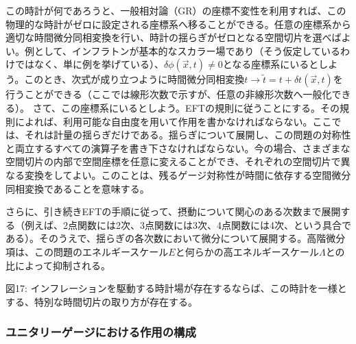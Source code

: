 この時計が何であろうと、一般相対論（GR）の座標不変性を利用すれば、この物理的な時計がゼロに設定される座標系へ移ることができる。任意の座標系から適切な時間微分同相変換を行い、時計の揺らぎがゼロとなる空間切片を選べばよい。例として、インフラトンが基本的なスカラー場であり（そう仮定しているわけではなく、単に例を挙げている）、$\delta\phi(\vec{x},t)\ne0$となる座標系にいるとしよう。このとき、次式が成り立つように時間微分同相変換$t\to\tilde{t}=t+\delta t(\vec{x},t)$を行うことができる（ここでは線形次数で示すが、任意の非線形次数へ一般化できる）。
さて、この座標系にいるとしよう。EFTの規則に従うことにする。その規則によれば、利用可能な自由度を用いて作用を書かなければならない。ここでは、それは計量の揺らぎだけである。揺らぎについて展開し、この問題の対称性と両立するすべての演算子を書き下さなければならない。今の場合、さまざまな空間切片の内部で空間座標を任意に変えることができ、それぞれの空間切片で異なる変換をしてよい。このことは、残るゲージ対称性が時間に依存する空間微分同相変換であることを意味する。

さらに、引き続きEFTの手順に従って、摂動について関心のある次数まで展開する（例えば、2点関数には2次、3点関数には3次、4点関数には4次、という具合である）。そのうえで、揺らぎの各次数において微分について展開する。高階微分項は、この問題のエネルギースケール$E$と何らかの高エネルギースケール$\Lambda$との比によって抑制される。

\noindent\begin{minipage}{\linewidth}
\begin{center}
図17: インフレーションを駆動する時計場が存在するならば、この時計を一様とする、特別な時間切片の取り方が存在する。
\end{center}
\end{minipage}\par\medskip

\subsubsection{ユニタリーゲージにおける作用の構成}

